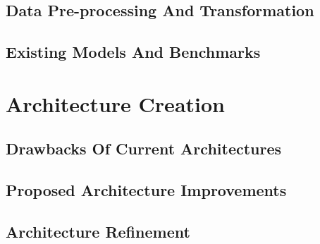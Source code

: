 \documentclass[12pt]{report}
\begin{document}
        \section{Data Pre-processing And Transformation}\label{c32}
        \section{Existing Models And Benchmarks}\label{c33}
    \chapter{\centering Architecture Creation}\label{c4}
        \section{Drawbacks Of Current Architectures}\label{c41}
        \section{Proposed Architecture Improvements}\label{c42}
        \section{Architecture Refinement}\label{c43}
    \begin{appendices}
        

    \end{appendices}
    
\end{document}
